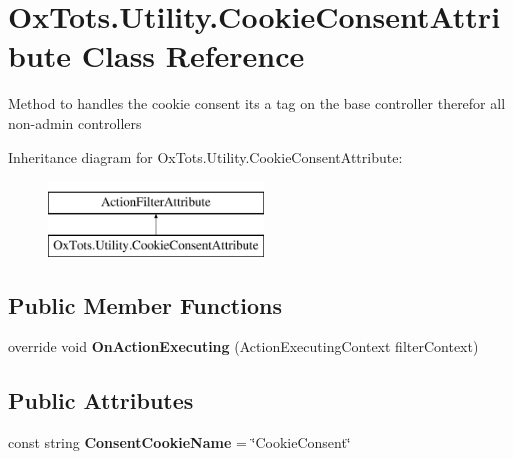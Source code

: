 \hypertarget{class_ox_tots_1_1_utility_1_1_cookie_consent_attribute}{}\section{Ox\+Tots.\+Utility.\+Cookie\+Consent\+Attribute Class Reference}
\label{class_ox_tots_1_1_utility_1_1_cookie_consent_attribute}


Method to handles the cookie consent it\textquotesingle{}s a tag on the base controller therefor all non-\/admin controllers  


Inheritance diagram for Ox\+Tots.\+Utility.\+Cookie\+Consent\+Attribute\+:\begin{figure}[H]
\begin{center}
\leavevmode
\includegraphics[height=2.000000cm]{class_ox_tots_1_1_utility_1_1_cookie_consent_attribute}
\end{center}
\end{figure}
\subsection*{Public Member Functions}
\begin{DoxyCompactItemize}
\item 
\mbox{\label{class_ox_tots_1_1_utility_1_1_cookie_consent_attribute_a7a9065631b72f627ff2c0eb992d432e5}} 
override void {\bfseries On\+Action\+Executing} (Action\+Executing\+Context filter\+Context)
\end{DoxyCompactItemize}
\subsection*{Public Attributes}
\begin{DoxyCompactItemize}
\item 
\mbox{\label{class_ox_tots_1_1_utility_1_1_cookie_consent_attribute_afb101b0dc59bd57d0c7d06cf91ea28aa}} 
const string {\bfseries Consent\+Cookie\+Name} = \char`\"{}Cookie\+Consent\char`\"{}
\end{DoxyCompactItemize}


